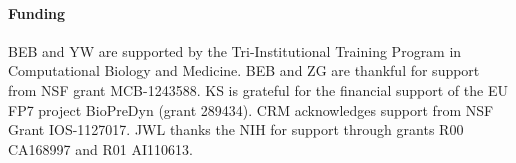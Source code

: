\documentclass{bioinfo}
\begin{document}
\paragraph{Funding\textcolon}
BEB and YW are supported by the Tri-Institutional Training Program in Computational Biology and Medicine.
BEB and ZG are thankful for support from NSF grant MCB-1243588.
KS is grateful for the financial support of the EU FP7 project BioPreDyn (grant 289434).
CRM acknowledges support from NSF Grant IOS-1127017.
JWL thanks the NIH for support through grants R00 CA168997 and R01 AI110613.


%
%
%
%
%
%
%
%
%



\end{document}
